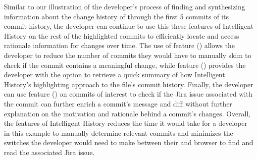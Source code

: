 Similar to our illustration of the developer's process of finding and synthesizing information about the change history of  through the first 5 commits of its commit history, the developer can continue to use this these features of Intelligent History on the rest of the highlighted commits to efficiently locate and access rationale information for changes over time.
The use of feature () allows the developer to reduce the number of commits they would have to manually skim to check if the commit contains a meaningful change, while feature () provides the developer with the option to retrieve a quick summary of how Intelligent History's highlighting approach to the file's commit history.
Finally, the developer can use feature () on commits of interest to check if the Jira issue associated with the commit can further enrich a commit's message and diff without further explanation on the motivation and rationale behind a commit's changes.
Overall, the features of Intelligent History reduces the time it would take for a developer in this example to manually determine relevant commits and minimizes the switches the developer would need to make between their  and browser to find and read the associated Jira issue.

\endinput

Any text after an \endinput is ignored.
You could put scraps here or things in progress.